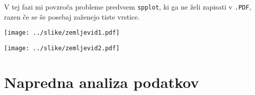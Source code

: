 \documentclass[11pt,a4paper]{article}
\begin{document}
V tej fazi mi povzroča probleme predvsem \verb|spplot|, ki ga ne želi zapisati v \verb|.PDF|, razen če se še posebaj zaženejo tiste vrstice. \newpage

\begin{sidewaysfigure}[ht]
	\texttt{[image: ../slike/zemljevid1.pdf]}
\end{sidewaysfigure}


\begin{sidewaysfigure}[ht]
	\texttt{[image: ../slike/zemljevid2.pdf]}
\end{sidewaysfigure}

\newpage

\section{Napredna analiza podatkov}

\begin{center}
\end{center}
\end{document}
